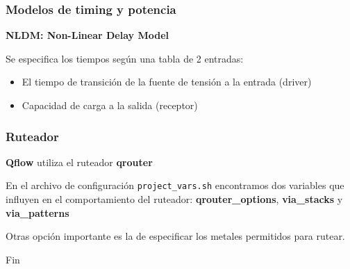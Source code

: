 \documentclass{beamer}
\begin{document}
\begin{frame}
  \frametitle{Modelos de timing y potencia} 

 \textbf{NLDM: Non-Linear Delay Model} 
   \begin{figure}[ht]
      \centering
    \end{figure}
    Se especifica los tiempos según una tabla de 2 entradas:
    \begin{itemize}
	\item El tiempo de transición de la fuente de tensión a la entrada (driver)
	\item Capacidad de carga a la salida (receptor)
\end{itemize}

\end{frame}

\begin{frame}[fragile]
  \frametitle{Ruteador}
  \textbf{Qflow} utiliza el ruteador \textbf{qrouter}

  En el archivo de configuración \verb#project_vars.sh# encontramos dos variables que influyen en el comportamiento del ruteador: \textbf{qrouter\_options}, \textbf{via\_stacks} y \textbf{via\_patterns}

  Otras opción importante es la de especificar los metales permitidos para rutear.
\end{frame}


\begin{frame}
\Huge{\centerline{Fin}}
\end{frame}

\end{document}
